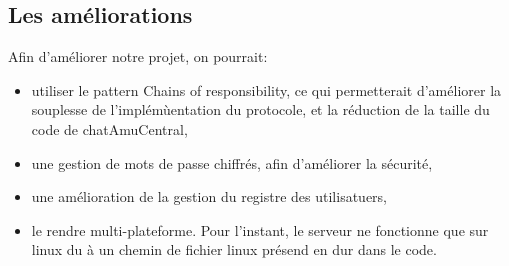 \subsection{Les améliorations}
Afin d'améliorer notre projet, on pourrait:
\begin{itemize}
	\item utiliser le pattern Chains of responsibility, ce qui permetterait d'améliorer la souplesse de l'implémùentation du protocole, et la réduction de la taille du code de chatAmuCentral,
	\item une gestion de mots de passe chiffrés, afin d'améliorer la sécurité,
	\item une amélioration de la gestion du registre des utilisatuers,
	\item le rendre multi-plateforme. Pour l'instant, le serveur ne fonctionne que sur linux du à un chemin de fichier linux présend en dur dans le code.
\end{itemize}
